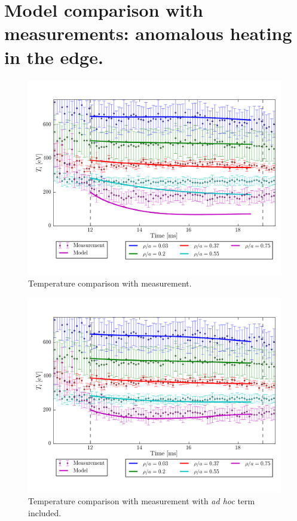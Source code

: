 
\section{Model comparison with measurements: anomalous heating in the edge.}\label{sec:results_results}
\begin{figure}
    \centering
    \includegraphics[width = \linewidth]{ion_transport_results/temperature_results.png}
    \caption[Temperature comparison with measurement]{Temperature comparison with measurement.}
    \label{fig:temperature_results}
\end{figure}

\begin{figure}
    \centering
    \includegraphics[width = \linewidth]{ion_transport_results/temperature_with_adhoc.png}
    \caption[Temperature comparison with measurement with \textit{ad hoc} term included]{Temperature comparison with measurement with \textit{ad hoc} term included.}
    \label{fig:temperature_results_ah}
\end{figure}

